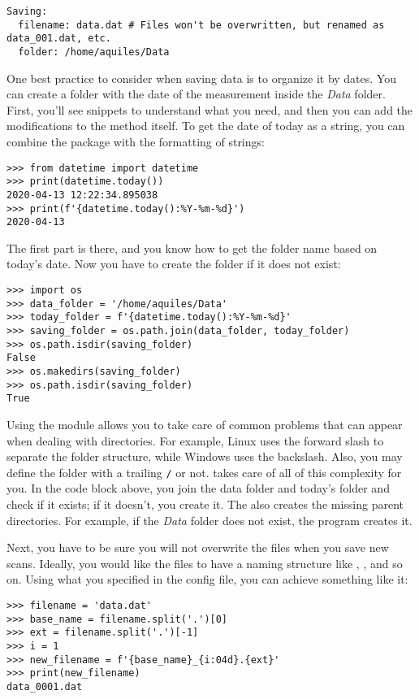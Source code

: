 \begin{verbatim}
Saving:
  filename: data.dat # Files won't be overwritten, but renamed as data_001.dat, etc.
  folder: /home/aquiles/Data
\end{verbatim}

One best practice to consider when saving data is to organize it by dates. You can create a folder with the date of the measurement inside the \emph{Data} folder. First, you'll see snippets to understand what you need, and then you can add the modifications to the method itself. To get the date of today as a string, you can combine the  package with the formatting of strings:

\begin{verbatim}
>>> from datetime import datetime
>>> print(datetime.today())
2020-04-13 12:22:34.895038
>>> print(f'{datetime.today():%Y-%m-%d}')
2020-04-13
\end{verbatim}

The first part is there, and you know how to get the folder name based on today's date. Now you have to create the folder if it does not exist:

\begin{verbatim}
>>> import os
>>> data_folder = '/home/aquiles/Data'
>>> today_folder = f'{datetime.today():%Y-%m-%d}'
>>> saving_folder = os.path.join(data_folder, today_folder)
>>> os.path.isdir(saving_folder)
False
>>> os.makedirs(saving_folder)
>>> os.path.isdir(saving_folder)
True
\end{verbatim}

Using the  module allows you to take care of common problems that can appear when dealing with directories. For example, Linux uses the forward slash to separate the folder structure, while Windows uses the backslash. Also, you may define the folder with a trailing \texttt{/} or not.  takes care of all of this complexity for you. In the code block above, you join the data folder and today's folder and check if it exists; if it doesn't, you create it. The  also creates the missing parent directories. For example, if the \emph{Data} folder does not exist, the program creates it.

Next, you have to be sure you will not overwrite the files when you save new scans. Ideally, you would like the files to have a naming structure like , , and so on. Using what you specified in the config file, you can achieve something like it:

\begin{verbatim}
>>> filename = 'data.dat'
>>> base_name = filename.split('.')[0]
>>> ext = filename.split('.')[-1]
>>> i = 1
>>> new_filename = f'{base_name}_{i:04d}.{ext}'
>>> print(new_filename)
data_0001.dat
\end{verbatim}

